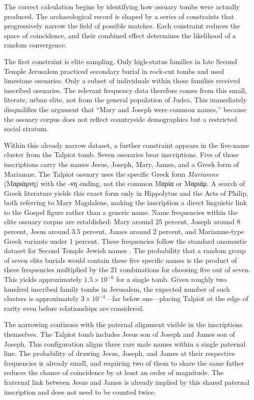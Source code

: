 The correct calculation begins by identifying how ossuary tombs were actually produced.
The archaeological record is shaped by a series of constraints that progressively narrow the field of possible matches.
Each constraint reduces the space of coincidence, and their combined effect determines the likelihood of a random convergence.

The first constraint is elite sampling.
Only high-status families in late Second Temple Jerusalem practiced secondary burial in rock-cut tombs and used limestone ossuaries.
Only a subset of individuals within those families received inscribed ossuaries.
The relevant frequency data therefore comes from this small, literate, urban elite, not from the general population of Judea.
This immediately disqualifies the argument that ``Mary and Joseph were common names,'' because the ossuary corpus does not reflect countryside demographics but a restricted social stratum.

Within this already narrow dataset, a further constraint appears in the five-name cluster from the Talpiot tomb.
Seven ossuaries bear inscriptions.
Five of those inscriptions carry the names Jesus, Joseph, Mary, James, and a Greek form of Mariamne.
The Talpiot ossuary uses the specific Greek form \emph{Mariamne} (Μαριάμνη) with the -νη ending, not the common Μαρία or Μαριάμ.
A search of Greek literature yields this exact form only in Hippolytus and the Acts of Philip, both referring to Mary Magdalene, making the inscription a direct linguistic link to the Gospel figure rather than a generic name.
Name frequencies within the elite ossuary corpus are established: Mary around 25 percent, Joseph around 8 percent, Jesus around 3.5 percent, James around 2 percent, and Mariamne-type Greek variants under 1 percent.
These frequencies follow the standard onomastic dataset for Second Temple Jewish names \cite{ilan:lexicon}.
The probability that a random group of seven elite burials would contain these five specific names is the product of these frequencies multiplied by the 21 combinations for choosing five out of seven.
This yields approximately $1.5 \times 10^{-6}$ for a single tomb.
Given roughly two hundred inscribed family tombs in Jerusalem, the expected number of such clusters is approximately $3 \times 10^{-4}$---far below one---placing Talpiot at the edge of rarity even before relationships are considered.

The narrowing continues with the paternal alignment visible in the inscriptions themselves.
The Talpiot tomb includes Jesus son of Joseph and James son of Joseph.
This configuration aligns three rare male names within a single paternal line.
The probability of drawing Jesus, Joseph, and James at their respective frequencies is already small, and requiring two of them to share the same father reduces the chance of coincidence by at least an order of magnitude.
The fraternal link between Jesus and James is already implied by this shared paternal inscription and does not need to be counted twice.


